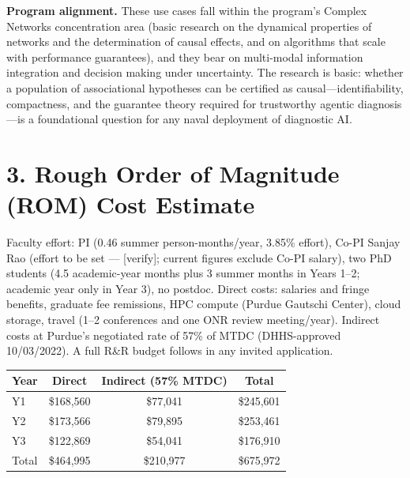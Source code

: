 \documentclass[12pt]{article}
\begin{document}
\textbf{Program alignment.} These use cases fall within the program's Complex Networks concentration area (basic research on the dynamical properties of networks and the determination of causal effects, and on algorithms that scale with performance guarantees), and they bear on multi-modal information integration and decision making under uncertainty. The research is basic: whether a population of associational hypotheses can be certified as causal---identifiability, compactness, and the guarantee theory required for trustworthy agentic diagnosis---is a foundational question for any naval deployment of diagnostic AI.

\section*{3. Rough Order of Magnitude (ROM) Cost Estimate}

Faculty effort: PI (0.46 summer person-months/year, 3.85\% effort), Co-PI Sanjay Rao (effort to be set --- [verify]; current figures exclude Co-PI salary), two PhD students (4.5 academic-year months plus 3 summer months in Years 1--2; academic year only in Year 3), no postdoc. Direct costs: salaries and fringe benefits, graduate fee remissions, HPC compute (Purdue Gautschi Center), cloud storage, travel (1--2 conferences and one ONR review meeting/year). Indirect costs at Purdue's negotiated rate of 57\% of MTDC (DHHS-approved 10/03/2022). A full R\&R budget follows in any invited application.

\begin{center} \normalsize \renewcommand{\arraystretch}{0.92} \begin{tabular}{lccc} \hline Year & Direct & Indirect (57\% MTDC) & Total \\
\hline
Y1 & \$168,560 & \$77,041 & \$245,601 \\
Y2 & \$173,566 & \$79,895 & \$253,461 \\
Y3 & \$122,869 & \$54,041 & \$176,910 \\
Total & \$464,995 & \$210,977 & \$675,972 \\
\hline \end{tabular} \end{center}
\end{document}
